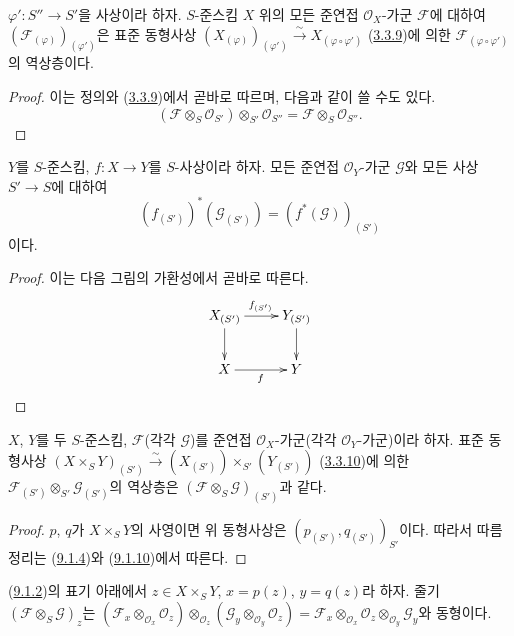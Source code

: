\begin{proposition}[9.1.9]
\label{I.9.1.9-ko}
$\varphi':S''\to S'$을 사상이라 하자. $S$-준스킴 $X$ 위의 모든 준연접
$\mathscr{O}_X$-가군 $\mathscr{F}$에 대하여
$(\mathscr{F}_{(\varphi)})_{(\varphi')}$은 표준 동형사상
$(X_{(\varphi)})_{(\varphi')}\xrightarrow{\sim}
X_{(\varphi\circ\varphi')}$
(\hyperref[I.3.3.9-ko]{3.3.9})에 의한
$\mathscr{F}_{(\varphi\circ\varphi')}$의 역상층이다.
\end{proposition}

\begin{proof}
이는 정의와 (\hyperref[I.3.3.9-ko]{3.3.9})에서 곧바로 따르며, 다음과
같이 쓸 수도 있다.
\[
  (\mathscr{F}\otimes_S\mathscr{O}_{S'})
  \otimes_{S'}\mathscr{O}_{S''}
  =\mathscr{F}\otimes_S\mathscr{O}_{S''}.
  \tag{9.1.9.1}\label{I.9.1.9.1-ko}
\]
\end{proof}

\begin{proposition}[9.1.10]
\label{I.9.1.10-ko}
$Y$를 $S$-준스킴, $f:X\to Y$를 $S$-사상이라 하자. 모든 준연접
$\mathscr{O}_Y$-가군 $\mathscr{G}$와 모든 사상 $S'\to S$에 대하여
\[
  (f_{(S')})^*(\mathscr{G}_{(S')})
  =(f^*(\mathscr{G}))_{(S')}
\]
이다.
\end{proposition}

\begin{proof}
이는 다음 그림의 가환성에서 곧바로 따른다.
\[
  \xymatrix{
    X_{(S')}\ar[r]^{f_{(S')}}\ar[d] &
    Y_{(S')}\ar[d]\\
    X\ar[r]_f &
    Y
  }
\]
\end{proof}

\begin{corollary}[9.1.11]
\label{I.9.1.11-ko}
$X$, $Y$를 두 $S$-준스킴, $\mathscr{F}$(각각 $\mathscr{G}$)를 준연접
$\mathscr{O}_X$-가군(각각 $\mathscr{O}_Y$-가군)이라 하자. 표준
동형사상 $(X\times_S Y)_{(S')}\xrightarrow{\sim}
(X_{(S')})\times_{S'}(Y_{(S')})$
(\hyperref[I.3.3.10-ko]{3.3.10})에 의한
$\mathscr{F}_{(S')}\otimes_{S'}\mathscr{G}_{(S')}$의 역상층은
$(\mathscr{F}\otimes_S\mathscr{G})_{(S')}$과 같다.
\end{corollary}

\begin{proof}
$p$, $q$가 $X\times_S Y$의 사영이면 위 동형사상은
$(p_{(S')},q_{(S')})_{S'}$이다. 따라서 따름정리는
(\hyperref[I.9.1.4-ko]{9.1.4})와
(\hyperref[I.9.1.10-ko]{9.1.10})에서 따른다.
\end{proof}

\begin{proposition}[9.1.12]
\label{I.9.1.12-ko}
(\hyperref[I.9.1.2-ko]{9.1.2})의 표기 아래에서
$z\in X\times_S Y$, $x=p(z)$, $y=q(z)$라 하자. 줄기
$(\mathscr{F}\otimes_S\mathscr{G})_z$는
$(\mathscr{F}_x\otimes_{\mathscr{O}_x}\mathscr{O}_z)
\otimes_{\mathscr{O}_z}
(\mathscr{G}_y\otimes_{\mathscr{O}_y}\mathscr{O}_z)
=\mathscr{F}_x\otimes_{\mathscr{O}_x}\mathscr{O}_z
\otimes_{\mathscr{O}_y}\mathscr{G}_y$와 동형이다.
\end{proposition}

